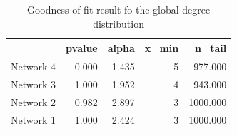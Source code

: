 \documentclass[a4paper, 12pt]{article}
\begin{document}
    \begin{table}
        \begin{tabular}{lrrrr}
            \hline
                       &   pvalue &   alpha &   x\_min &   n\_tail \\
                       \hline
                        Network 4 &    0.000 &   1.435 &       5 &  977.000 \\
                         Network 3 &    1.000 &   1.952 &       4 &  943.000 \\
                          Network 2 &    0.982 &   2.897 &       3 & 1000.000 \\
                           Network 1 &    1.000 &   2.424 &       3 & 1000.000 \\
                           \hline
        \end{tabular}

        \caption{Goodness of fit result fo the global degree distribution}
    \end{table}
\end{document}
